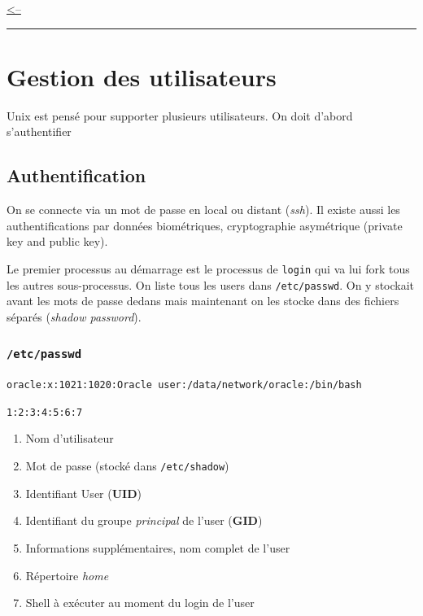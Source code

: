 \href{../README.md}{\textless--}

\begin{center}\rule{0.5\linewidth}{0.5pt}\end{center}

\section{Gestion des utilisateurs}\label{gestion-des-utilisateurs}

Unix est pensé pour supporter plusieurs utilisateurs. On doit d'abord
s'authentifier

\subsection{Authentification}\label{authentification}

On se connecte via un mot de passe en local ou distant (\emph{ssh}). Il
existe aussi les authentifications par données biométriques,
cryptographie asymétrique (private key and public key).

Le premier processus au démarrage est le processus de \texttt{login} qui
va lui fork tous les autres sous-processus. On liste tous les users dans
\texttt{/etc/passwd}. On y stockait avant les mots de passe dedans mais
maintenant on les stocke dans des fichiers séparés (\emph{shadow
password}).

\subsubsection{\texorpdfstring{\texttt{/etc/passwd}}{/etc/passwd}}\label{etcpasswd}

\texttt{oracle:x:1021:1020:Oracle\ user:/data/network/oracle:/bin/bash}

\texttt{1:2:3:4:5:6:7}

\begin{enumerate}
\def\labelenumi{\arabic{enumi}.}
\tightlist
\item
  Nom d'utilisateur
\item
  Mot de passe (stocké dans \texttt{/etc/shadow})
\item
  Identifiant User (\textbf{UID})
\item
  Identifiant du groupe \emph{principal} de l'user (\textbf{GID})
\item
  Informations supplémentaires, nom complet de l'user
\item
  Répertoire \emph{home}
\item
  Shell à exécuter au moment du login de l'user
\end{enumerate}

